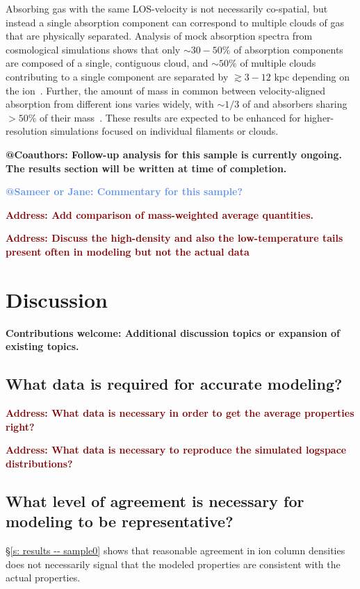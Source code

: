 \documentclass[fleqn,usenatbib]{mnras}
\makeatletter
\newcommand{\thoughts}[1]{\textcolor{BurntOrange}{\textbf{Contributions welcome: #1}}}
\newcommand{\todo}[1]{\textcolor{Maroon}{\textbf{Address: #1}}}
\newcommand{\note}[1]{\textbf{@Coauthors: #1}}
\newcommand{\atsameer}[1]{\textcolor{CornflowerBlue}{\textbf{@Sameer or Jane: #1}}}
\makeatother
\begin{document}
Absorbing gas with the same LOS-velocity is not necessarily co-spatial, but instead a single absorption component can correspond to multiple clouds of gas that are physically separated.
Analysis of mock absorption spectra from cosmological simulations shows that only $\sim 30-50\%$ of absorption components are composed of a single, contiguous cloud, and $\sim 50\%$ of multiple clouds contributing to a single component are separated by $\gtrsim 3-12$ kpc depending on the ion~\citep[][]{Marra2022}.
Further, the amount of mass in common between velocity-aligned absorption from different ions varies widely, with $\sim 1/3$ of  and  absorbers sharing $>50\%$ of their mass~\citep[][]{Marra2022}.
These results are expected to be enhanced for higher-resolution simulations focused on individual filaments or clouds.

\note{
Follow-up analysis for this sample is currently ongoing.
The results section will be written at time of completion.
}

\atsameer{Commentary for this sample?}

\todo{Add comparison of mass-weighted average quantities.}

\todo{Discuss the high-density and also the low-temperature tails present often in modeling but not the actual data}

\section{Discussion}
\label{s: discussion}

\thoughts{Additional discussion topics or expansion of existing topics.}

\subsection{What data is required for accurate modeling?}

\todo{What data is necessary in order to get the average properties right?}

\todo{What data is necessary to reproduce the simulated logspace distributions?}

\subsection{What level of agreement is necessary for modeling to be representative?}

\S\ref{s: results -- sample0} shows that reasonable agreement in ion column densities does not necessarily signal that the modeled properties are consistent with the actual properties.
\end{document}
